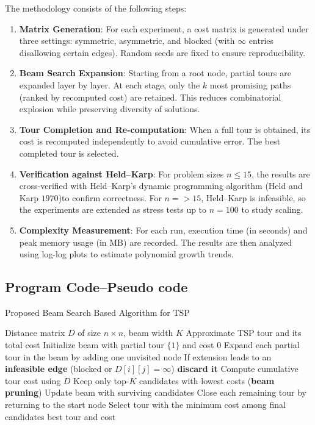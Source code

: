\documentclass[sn-mathphys]{article}
\theoremstyle{thmstyleone}%
\theoremstyle{thmstyletwo}%
\theoremstyle{thmstylethree}%
\begin{document}
The methodology consists of the following steps:
\begin{enumerate}
    \item \textbf{Matrix Generation}:  
    For each experiment, a cost matrix is generated under three settings: 
    symmetric, asymmetric, and blocked (with $\infty$ entries disallowing certain edges). 
    Random seeds are fixed to ensure reproducibility.
    
    \item \textbf{Beam Search Expansion}:  
    Starting from a root node, partial tours are expanded layer by layer. 
    At each stage, only the $k$ most promising paths (ranked by recomputed cost) are retained. 
    This reduces combinatorial explosion while preserving diversity of solutions.
    
    \item \textbf{Tour Completion and Re-computation}:  
    When a full tour is obtained, its cost is recomputed independently 
    to avoid cumulative error. The best completed tour is selected.
    
    \item \textbf{Verification against Held--Karp}:  
    For problem sizes $n \leq 15$, the results are cross-verified with 
    Held--Karp’s dynamic programming algorithm (Held and Karp $1970$)to confirm correctness. 
    For $n => 15$, Held--Karp is infeasible, so the experiments 
    are extended as stress tests up to $n=100$ to study scaling.
    
    \item \textbf{Complexity Measurement}:  
    For each run, execution time (in seconds) and peak memory usage (in MB) 
    are recorded. The results are then analyzed using log-log plots 
    to estimate polynomial growth trends.
\end{enumerate}

\subsection{Program Code--Pseudo code}

\begin{algorithm}[H]
\caption{Proposed Beam Search Based Algorithm for TSP}
\label{alg:beam-tsp}
\begin{algorithmic}[1]
\Require Distance matrix $D$ of size $n \times n$, beam width $K$
\Ensure Approximate TSP tour and its total cost
\State Initialize beam with partial tour $\{1\}$ and cost $0$
    \State Expand each partial tour in the beam by adding one unvisited node
        \State If extension leads to an \textbf{infeasible edge} (blocked or $D[i][j]=\infty$) \textbf{discard it}
        \State Compute cumulative tour cost using $D$
    \EndFor
    \State Keep only top-$K$ candidates with lowest costs (\textbf{beam pruning})
    \State Update beam with surviving candidates
\EndFor
\State Close each remaining tour by returning to the start node
\State Select tour with the minimum cost among final candidates
\State \Return best tour and cost
\end{algorithmic}
\end{algorithm}
\end{document}
